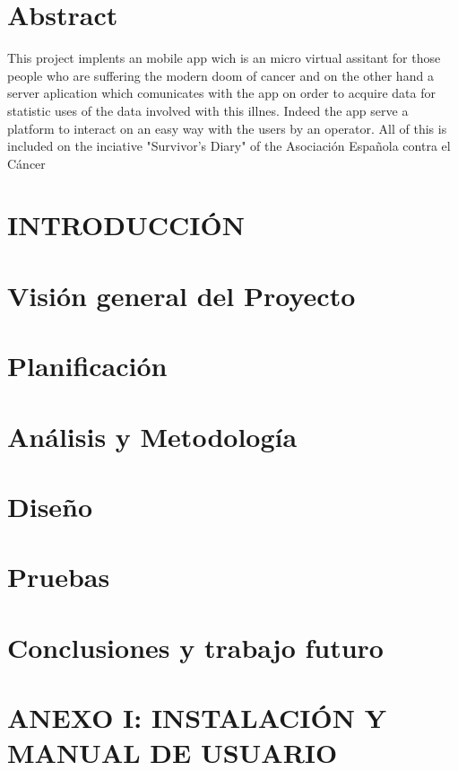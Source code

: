 \documentclass[b5paper,10pt,twoside]{book}
\begin{document}
	\chapter*{Abstract}
	 	This project implents an mobile app wich is an micro virtual assitant for those people who are suffering the modern doom of cancer and on the other hand a server aplication which comunicates with the app on order to acquire data for statistic uses of the data involved with this illnes. Indeed the app serve a platform to interact on an easy way with the users by an operator. All of this is included on the inciative "Survivor's Diary" of the  Asociación Española contra el Cáncer\cite{SHAREESP}
	
	\tableofcontents
	
	\listoffigures
	
	\listoftables
	

	\chapter{INTRODUCCIÓN}
	
	
	
	\chapter{Visión general del Proyecto}

	
	
	\chapter{Planificación}
	
	
	
	\chapter{Análisis y Metodología}
	
	
	
	\chapter{Diseño}
	
	
	
	\chapter{Pruebas}
	
	
	
	\chapter{Conclusiones y trabajo futuro}
	
	
	
	\chapter{ANEXO I: INSTALACIÓN Y MANUAL DE USUARIO }
		
	
		
	
		
	
\end{document}
